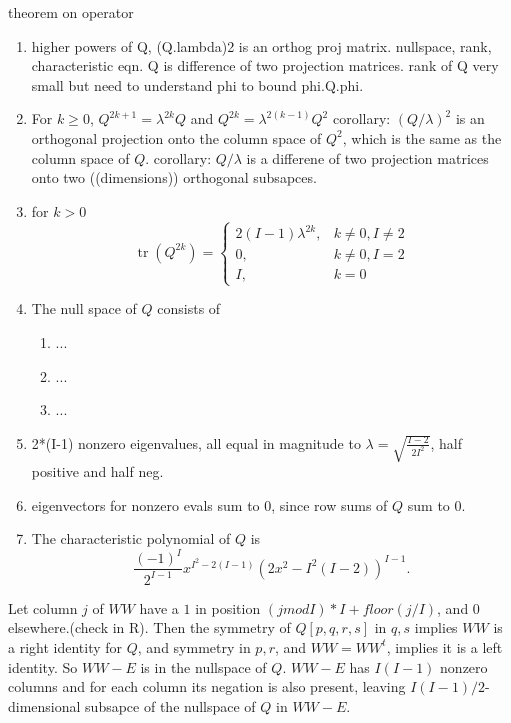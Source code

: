 \documentclass{article}
\DeclareMathOperator{\tr}{tr}
\newcommand{\I}{I}
\newcommand{\Id}{E}
\newcommand{\Q}{Q}
\newcommand{\eigval}{\lambda}
\begin{document}
\begin{enumerate}
\begin{enumerate}
theorem on operator
\begin{enumerate}
\item higher powers of Q, (Q.lambda)2 is an orthog proj matrix. nullspace,
  rank, characteristic eqn.  Q is difference of two projection matrices.
  rank of Q very small but need to understand phi to bound phi.Q.phi.
\item For $k\ge 0$, $\Q^{2k+1}=\eigval^{2k}\Q$ and $\Q^{2k}=\eigval^{2(k-1)}\Q^2$
corollary: $(\Q/\eigval)^2$ is an
  orthogonal projection onto the column space of $\Q^2$, which is the
  same as the column space of $\Q$. corollary: $\Q/\eigval$ is a
  differene of two projection matrices onto two ((dimensions))
  orthogonal subsapces.
\item for $k>0$
\[
  \tr(\Q^{2k})=\begin{cases}
    2(\I-1)\eigval^{2k}, &k\neq 0, \I\neq 2\\
    0, &k\neq 0, \I=2\\
    \I, &k=0
  \end{cases}
\]  
\item The null space of $\Q$ consists of
  \begin{enumerate}
  \item ...
  \item ...
  \item ...
  \end{enumerate}
\item 2*(I-1) nonzero eigenvalues, all equal in magnitude to
  $\eigval=\sqrt{\frac{\I-2}{2\I^2}}$, half positive and half neg.
\item eigenvectors for nonzero evals sum to 0, since row sums of $\Q$ sum to $0$.
\item The characteristic polynomial of $\Q$ is
\[
  \frac{(-1)^{\I}}{2^{\I-1}}x^{\I^2-2(\I-1)}(2x^2-\I^2(\I-2))^{\I-1}.
\]
\end{enumerate}

Let column $j$ of $WW$ have a $1$ in position
$(j mod \I)*\I + floor(j/I)$, and $0$ elsewhere.(check in R). Then the
symmetry of $\Q[p,q,r,s]$ in $q,s$ implies $WW$ is a right identity
for $\Q$, and symmetry in $p,r$, and $WW=WW^t$, implies it is a left
identity. So $WW-\Id$ is in the nullspace of $Q$. $WW-\Id$ has
$I(I-1)$ nonzero columns and for each column its negation is also
present, leaving $I(I-1)/2$-dimensional subsapce of the nullspace of
$\Q$ in $WW-\Id$.





\end{enumerate}
\end{enumerate}
\end{document}
